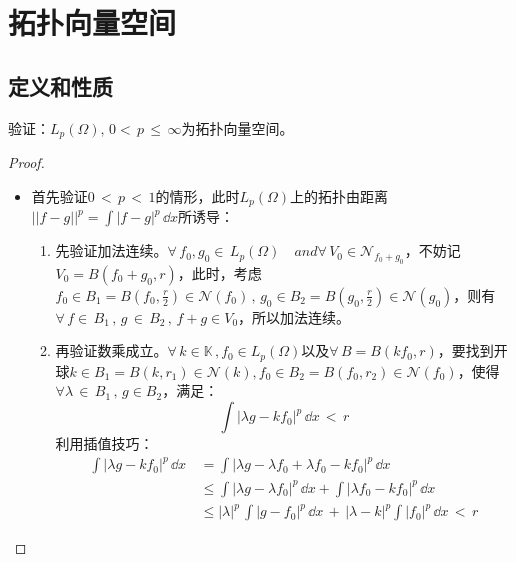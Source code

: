 
\section{拓扑向量空间}
\subsection{定义和性质}

\begin{definition}[拓扑向量空间]
	
\end{definition}

\begin{example}
	验证：$L_{p}(\Omega),\, 0<\, p\,\leq\, \infty$为拓扑向量空间。
\end{example}

\begin{proof}
	\begin{itemize}
		\item 首先验证$0\, < \, p\, < \, 1$的情形，此时$L_{p}(\Omega)$上的拓扑由距离$||f-g||^{p}=\int |f-g|^{p}\, \dd x$所诱导：
		\begin{enumerate}
			\item 先验证加法连续。$\forall \, f_{0},g_{0}\in \, L_{p}(\Omega) \quad and \forall \, V_{0}\in \mathcal{N}_{f_{0}+g_{0}}$，不妨记$V_{0}=B(f_{0}+g_{0},r)$，此时，考虑$f_{0}\in B_{1}=B(f_{0},\frac{r}{2})\in \mathcal{N}(f_{0})\, ,\, g_{0}\in B_{2}=B(g_{0},\frac{r}{2})\in\mathcal{N}(g_{0})$，则有$\forall \, f\in \, B_{1}\, ,\, g \, \in \, B_{2}\, ,\, f+g\in V_{0}$，所以加法连续。
			\item 再验证数乘成立。$\forall \, k\in\mathbb{K}\, ,f_{0}\in L_{p}(\Omega)$以及$\forall \, B=B(kf_{0},r)$，要找到开球$k\in B_{1}=B(k,r_{1})\in \mathcal{N}(k),f_{0}\in  B_{2}=B(f_{0},r_{2})\in \mathcal{N}(f_{0})$，使得$\forall \lambda\, \in \, B_{1}\, , \, g\in B_{2}$，满足：
			\begin{equation*}
				\int |\lambda g-kf_{0}|^{p}\, \dd x\, < \, r
			\end{equation*}
		利用插值技巧：
			\begin{equation*}
				\begin{aligned}
				\int |\lambda g-kf_{0}|^{p}\,\dd
				 x \, &=\int |\lambda g-\lambda f_{0} + \lambda f_{0}-kf_{0}|^{p}\,\dd x\\
				 &\leq \int |\lambda g-\lambda f_{0}|^{p}\,\dd x +\int |\lambda f_{0}-kf_{0}|^{p}\, \dd x\\
				 &\leq |\lambda|^{p}\, \int |g-f_{0}|^{p}\,\dd x \,+\, |\lambda -k|^{p} \int |f_{0}|^{p}\,\dd x \, < \,r 			 

\end{aligned}
\end{equation*}
\end{enumerate}
\end{itemize}
\end{proof}
